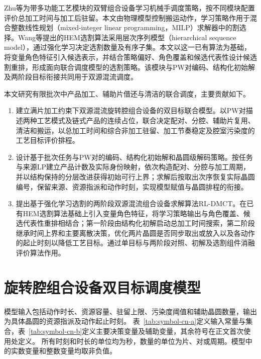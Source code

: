 \documentclass[final,5p,times,twocolumn]{elsarticle}
\begin{document}
Zhu等为带多功能工艺模块的双臂组合设备学习机械手调度策略，按不同模块配置评价总加工时间与加工后驻留\citep{zhu2026multifunction}。本文由物理模型控制搬运动作，学习策略作用于混合整数线性规划（mixed-integer linear programming，MILP）求解器中的割选择\citep{tang2020cut,huang2022cutranking,paulus2022looking}。Wang等提出的HEM选割算法采用层次序列模型（hierarchical sequence model），通过强化学习决定选割数量及有序子集\citep{wang2023hem,wang2024hem}。本文以这一已有算法为基础，将变量角色特征引入候选表示，并结合策略偏好、角色覆盖和候选代表性设计候选割重排，形成面向联合调度模型的选割策略。该模块与PW对编码、结构化初始解及两阶段目标衔接共同用于双源混流调度。

本文研究有限批次中产品加工、辅助片借还与清洁的联合调度，主要贡献如下。
\begin{enumerate}[leftmargin=*]
\item 建立满片加工约束下双源混流旋转腔组合设备的双目标联合模型。以PW对描述两种工艺模式及链式产品的连续占位，联合决定配对、分腔、辅助片复用、清洁和搬运，以总加工时间和综合非加工驻留、加工节奏稳定及腔室污染度的工艺目标评价排程。
\item 设计基于批次任务与PW对的编码、结构化初始解和晶圆级解码策略。按任务与来源LP建立产品计数及实际身份映射，依次构造配对、分腔与加工周期，并以结构保持的分层改进获得初始可行上界；求解后按取出次序恢复实际晶圆编号，保留来源、资源指派和动作时刻，实现模型赋值与晶圆排程的衔接。
\item 提出基于强化学习选割的两阶段双源混流组合设备求解算法RL-DMCT。在已有HEM选割算法基础上引入变量角色特征，将学习策略输出与角色覆盖、候选代表性重排相结合；第一阶段由结构化初解启动总加工时间搜索，第二阶段继承时间上界和主要离散决策，优化两片晶圆是否同步取出或放入以及各动作的起止时刻以降低工艺目标。通过单目标与两阶段对照、初解及选割组件消融评价算法作用。
\end{enumerate}

\section{旋转腔组合设备双目标调度模型}
\setcounter{equation}{0}

模型输入包括动作时长、资源容量、驻留上限、污染度阈值和辅助晶圆数量，输出为具体晶圆的资源指派及动作起止时刻。
表~\ref{tab:symbol-cn-a}定义输入常量与集合，表~\ref{tab:symbol-cn-b}定义主要决策变量及辅助变量，其余符号在正文首次使用处定义。
所有时刻和时长的单位均为秒，数量的单位为片、对或周期。模型中的实数变量和整数变量均取非负值。
\end{document}
